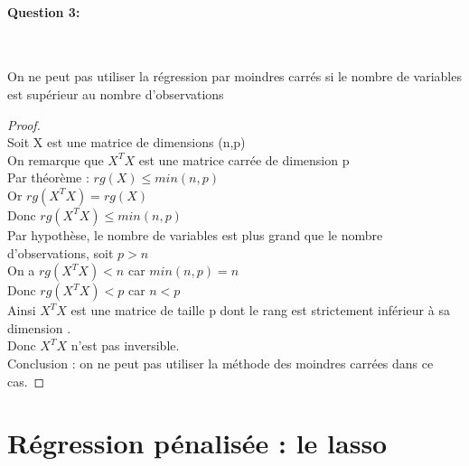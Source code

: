 \documentclass{article}
\begin{document}
\paragraph{Question 3:}
~\par

On ne peut pas utiliser la régression par moindres carrés si le 
nombre de variables est supérieur au nombre d'observations
\begin{proof}
~\\Soit X est une matrice de dimensions (n,p)
\vspace{2mm} %
\\On remarque que $X^{T}X$ est une matrice carrée de dimension p
\vspace{2mm} %
\\ Par théorème : $rg(X) \leq min(n,p)$
\vspace{2mm} %
\\Or $rg(X^{T}X) = rg(X)$
\vspace{2mm} %
\\Donc $rg(X^{T}X) \leq min(n,p)$
\vspace{2mm} %
\\Par hypothèse, le nombre de variables est plus grand que le nombre d'observations, soit $p > n$
\vspace{2mm} %
\\On a $rg(X^{T}X) < n $ car $min(n,p) = n$
\vspace{2mm} %
\\Donc $rg(X^{T}X) < p $ car $n < p$
\vspace{2mm} %
\\Ainsi $X^{T}X$ est une matrice de taille p dont le rang est strictement inférieur à sa dimension .
\vspace{2mm} %
\\Donc $X^{T}X$ n'est pas inversible.
\vspace{2mm} %
\\Conclusion : on ne peut pas utiliser la méthode des moindres carrées dans ce cas.
\end{proof}

\section{Régression pénalisée : le lasso}
\end{document}
